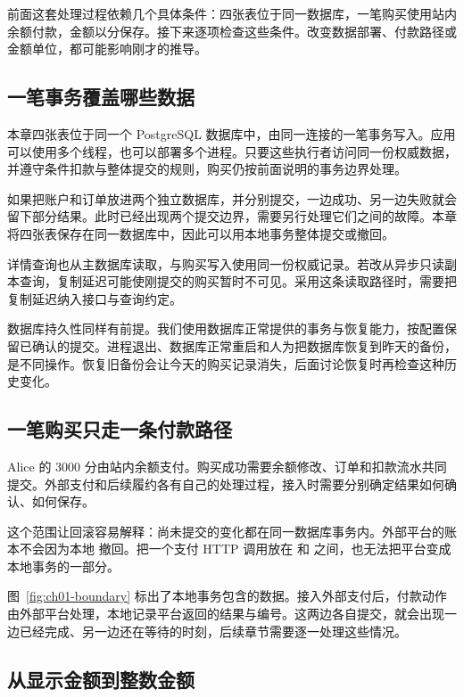 前面这套处理过程依赖几个具体条件：四张表位于同一数据库，一笔购买使用站内余额付款，金额以分保存。接下来逐项检查这些条件。改变数据部署、付款路径或金额单位，都可能影响刚才的推导。

\subsection*{一笔事务覆盖哪些数据}

本章四张表位于同一个 PostgreSQL 数据库中，由同一连接的一笔事务写入。应用可以使用多个线程，也可以部署多个进程。只要这些执行者访问同一份权威数据，并遵守条件扣款与整体提交的规则，购买仍按前面说明的事务边界处理。

如果把账户和订单放进两个独立数据库，并分别提交，一边成功、另一边失败就会留下部分结果。此时已经出现两个提交边界，需要另行处理它们之间的故障。本章将四张表保存在同一数据库中，因此可以用本地事务整体提交或撤回。

详情查询也从主数据库读取，与购买写入使用同一份权威记录。若改从异步只读副本查询，复制延迟可能使刚提交的购买暂时不可见。采用这条读取路径时，需要把复制延迟纳入接口与查询约定。

数据库持久性同样有前提。我们使用数据库正常提供的事务与恢复能力，按配置保留已确认的提交。进程退出、数据库正常重启和人为把数据库恢复到昨天的备份，是不同操作。恢复旧备份会让今天的购买记录消失，后面讨论恢复时再检查这种历史变化。

\subsection*{一笔购买只走一条付款路径}

Alice 的 3000 分由站内余额支付。购买成功需要余额修改、订单和扣款流水共同提交。外部支付和后续履约各有自己的处理过程，接入时需要分别确定结果如何确认、如何保存。

这个范围让回滚容易解释：尚未提交的变化都在同一数据库事务内。外部平台的账本不会因为本地  撤回。把一个支付 HTTP 调用放在  和  之间，也无法把平台变成本地事务的一部分。

图~\ref{fig:ch01-boundary} 标出了本地事务包含的数据。接入外部支付后，付款动作由外部平台处理，本地记录平台返回的结果与编号。这两边各自提交，就会出现一边已经完成、另一边还在等待的时刻，后续章节需要逐一处理这些情况。



\subsection*{从显示金额到整数金额}

